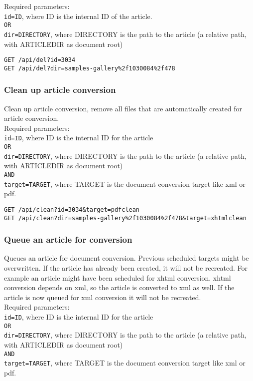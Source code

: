 \documentclass[a4paper]{article}
\begin{document}
Required parameters:\\
\texttt{id=ID}, where ID is the internal ID of the article.\\
\texttt{OR}\\
\texttt{dir=DIRECTORY}, where DIRECTORY is the path to the article (a relative path, with ARTICLEDIR as document root)\\

\begin{verbatim}
GET /api/del?id=3034
GET /api/del?dir=samples-gallery%2f1030084%2f478
\end{verbatim}

\subsubsection{Clean up article conversion}
Clean up article conversion, remove all files that are automatically created for article conversion.\\

Required parameters:\\
\texttt{id=ID}, where ID is the internal ID for the article\\
\texttt{OR}\\
\texttt{dir=DIRECTORY}, where DIRECTORY is the path to the article (a relative path, with ARTICLEDIR as document root)\\
\texttt{AND}\\
\texttt{target=TARGET}, where TARGET is the document conversion target like xml or pdf.

\begin{verbatim}
GET /api/clean?id=3034&target=pdfclean
GET /api/clean?dir=samples-gallery%2f1030084%2f478&target=xhtmlclean
\end{verbatim}

\subsubsection{Queue an article for conversion}
Queues an article for document conversion. Previous scheduled targets might be overwritten.
If the article has already been created, it will not be recreated. For example an article might have been scheduled for xhtml conversion. xhtml conversion depends on xml, so the article is converted to xml as well. If the article is now queued for xml conversion it will not be recreated.\\

Required parameters:\\
\texttt{id=ID}, where ID is the internal ID for the article\\
\texttt{OR}\\
\texttt{dir=DIRECTORY}, where DIRECTORY is the path to the article (a relative path, with ARTICLEDIR as document root)\\
\texttt{AND}\\
\texttt{target=TARGET}, where TARGET is the document conversion target like xml or pdf.
\end{document}
